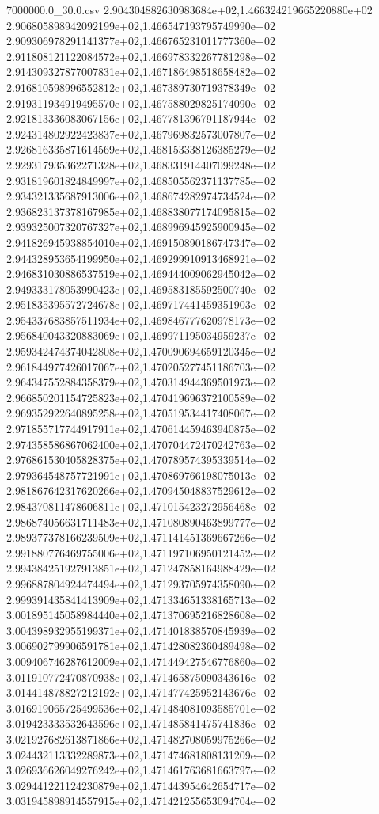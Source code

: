 \begin{filecontents*}{7000000.0_30.0.csv}
2.904304882630983684e+02,1.466324219665220880e+02
2.906805898942092199e+02,1.466547193795749990e+02
2.909306978291141377e+02,1.466765231011777360e+02
2.911808121122084572e+02,1.466978332267781298e+02
2.914309327877007831e+02,1.467186498518658482e+02
2.916810598996552812e+02,1.467389730719378349e+02
2.919311934919495570e+02,1.467588029825174090e+02
2.921813336083067156e+02,1.467781396791187944e+02
2.924314802922423837e+02,1.467969832573007807e+02
2.926816335871614569e+02,1.468153338126385279e+02
2.929317935362271328e+02,1.468331914407099248e+02
2.931819601824849997e+02,1.468505562371137785e+02
2.934321335687913006e+02,1.468674282974734524e+02
2.936823137378167985e+02,1.468838077174095815e+02
2.939325007320767327e+02,1.468996945925900945e+02
2.941826945938854010e+02,1.469150890186747347e+02
2.944328953654199950e+02,1.469299910913468921e+02
2.946831030886537519e+02,1.469444009062945042e+02
2.949333178053990423e+02,1.469583185592500740e+02
2.951835395572724678e+02,1.469717441459351903e+02
2.954337683857511934e+02,1.469846777620978173e+02
2.956840043320883069e+02,1.469971195034959237e+02
2.959342474374042808e+02,1.470090694659120345e+02
2.961844977426017067e+02,1.470205277451186703e+02
2.964347552884358379e+02,1.470314944369501973e+02
2.966850201154725823e+02,1.470419696372100589e+02
2.969352922640895258e+02,1.470519534417408067e+02
2.971855717744917911e+02,1.470614459463940875e+02
2.974358586867062400e+02,1.470704472470242763e+02
2.976861530405828375e+02,1.470789574395339514e+02
2.979364548757721991e+02,1.470869766198075013e+02
2.981867642317620266e+02,1.470945048837529612e+02
2.984370811478606811e+02,1.471015423272956468e+02
2.986874056631711483e+02,1.471080890463899777e+02
2.989377378166239509e+02,1.471141451369667266e+02
2.991880776469755006e+02,1.471197106950121452e+02
2.994384251927913851e+02,1.471247858164988429e+02
2.996887804924474494e+02,1.471293705974358090e+02
2.999391435841413909e+02,1.471334651338165713e+02
3.001895145058984440e+02,1.471370695216828608e+02
3.004398932955199371e+02,1.471401838570845939e+02
3.006902799906591781e+02,1.471428082360489498e+02
3.009406746287612009e+02,1.471449427546776860e+02
3.011910772470870938e+02,1.471465875090343616e+02
3.014414878827212192e+02,1.471477425952143676e+02
3.016919065725499536e+02,1.471484081093585701e+02
3.019423333532643596e+02,1.471485841475741836e+02
3.021927682613871866e+02,1.471482708059975266e+02
3.024432113332289873e+02,1.471474681808131209e+02
3.026936626049276242e+02,1.471461763681663797e+02
3.029441221124230879e+02,1.471443954642654717e+02
3.031945898914557915e+02,1.471421255653094704e+02

\end{filecontents*}
